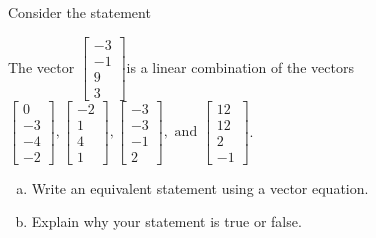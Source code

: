 
\begin{exerciseStatement}


Consider the statement 
\begin{center}\begin{minipage}{0.8\textwidth}
 The vector \( \left[\begin{array}{c}
-3 \\
-1 \\
9 \\
3
\end{array}\right] \)is a linear combination of the vectors \( \left[\begin{array}{c}
0 \\
-3 \\
-4 \\
-2
\end{array}\right] , \left[\begin{array}{c}
-2 \\
1 \\
4 \\
1
\end{array}\right] , \left[\begin{array}{c}
-3 \\
-3 \\
-1 \\
2
\end{array}\right] , \text{ and } \left[\begin{array}{c}
12 \\
12 \\
2 \\
-1
\end{array}\right] \). 
\end{minipage}\end{center}
    


\begin{enumerate}[(a)]
\item  Write an equivalent statement using a vector equation.
\item  Explain why your statement is true or false.
\end{enumerate}
    
\end{exerciseStatement}
    
